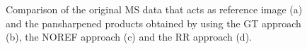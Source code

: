 \documentclass[12pt]{report}
\begin{document}
\begin{figure}
    \hfill
    \caption{Comparison of the original MS data that acts as reference image (a) and the pansharpened products obtained by using the GT approach (b), the NOREF approach (c) and the RR approach (d).}
    \label{fig:comparison_results}
\end{figure}
\end{document}
